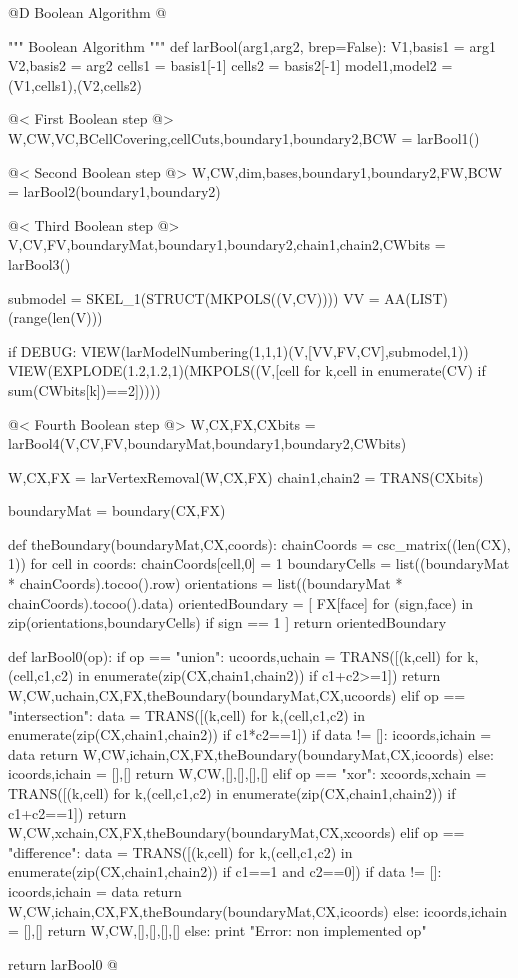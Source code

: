 \documentclass[11pt,oneside]{article}	%
\begin{document}
@D Boolean Algorithm
@{""" Boolean Algorithm """
def larBool(arg1,arg2, brep=False):
	V1,basis1 = arg1
	V2,basis2 = arg2
	cells1 = basis1[-1]
	cells2 = basis2[-1]
	model1,model2 = (V1,cells1),(V2,cells2)
		
	@< First Boolean step @>
	W,CW,VC,BCellCovering,cellCuts,boundary1,boundary2,BCW = larBool1()
	
	@< Second Boolean step @>
	W,CW,dim,bases,boundary1,boundary2,FW,BCW = larBool2(boundary1,boundary2)

	@< Third Boolean step @>
	V,CV,FV,boundaryMat,boundary1,boundary2,chain1,chain2,CWbits = larBool3()
	
	submodel = SKEL_1(STRUCT(MKPOLS((V,CV))))
	VV = AA(LIST)(range(len(V)))
	
	if DEBUG:
    	VIEW(larModelNumbering(1,1,1)(V,[VV,FV,CV],submodel,1))
    	VIEW(EXPLODE(1.2,1.2,1)(MKPOLS((V,[cell for k,cell in enumerate(CV) if sum(CWbits[k])==2]))))
	
	@< Fourth Boolean step @>
	W,CX,FX,CXbits = larBool4(V,CV,FV,boundaryMat,boundary1,boundary2,CWbits)

	W,CX,FX = larVertexRemoval(W,CX,FX)
	chain1,chain2 = TRANS(CXbits)
	
	boundaryMat = boundary(CX,FX)

	def theBoundary(boundaryMat,CX,coords):
		chainCoords = csc_matrix((len(CX), 1))
		for cell in coords: chainCoords[cell,0] = 1
		boundaryCells = list((boundaryMat * chainCoords).tocoo().row)
		orientations = list((boundaryMat * chainCoords).tocoo().data)
		orientedBoundary = [ FX[face] for (sign,face) in zip(orientations,boundaryCells)  if sign == 1 ]
		return orientedBoundary


	def larBool0(op):	
		if op == "union": 
			ucoords,uchain = TRANS([(k,cell) for k,(cell,c1,c2) in enumerate(zip(CX,chain1,chain2)) if c1+c2>=1])
			return W,CW,uchain,CX,FX,theBoundary(boundaryMat,CX,ucoords)
		elif op == "intersection": 
			data = TRANS([(k,cell) for k,(cell,c1,c2) in enumerate(zip(CX,chain1,chain2)) if c1*c2==1])
			if data != []: 
				icoords,ichain = data
				return W,CW,ichain,CX,FX,theBoundary(boundaryMat,CX,icoords)
			else: 
				icoords,ichain = [],[]
				return W,CW,[],[],[],[]
		elif op == "xor": 
			xcoords,xchain = TRANS([(k,cell) for k,(cell,c1,c2) in enumerate(zip(CX,chain1,chain2)) if c1+c2==1])
			return W,CW,xchain,CX,FX,theBoundary(boundaryMat,CX,xcoords)
		elif op == "difference": 
			data = TRANS([(k,cell) for k,(cell,c1,c2) in enumerate(zip(CX,chain1,chain2)) if c1==1 and c2==0])
			if data != []: 
				icoords,ichain = data
				return W,CW,ichain,CX,FX,theBoundary(boundaryMat,CX,icoords)
			else: 
				icoords,ichain = [],[]
				return W,CW,[],[],[],[]
		else: print "Error: non implemented op"

	return larBool0
@}
\end{document}

